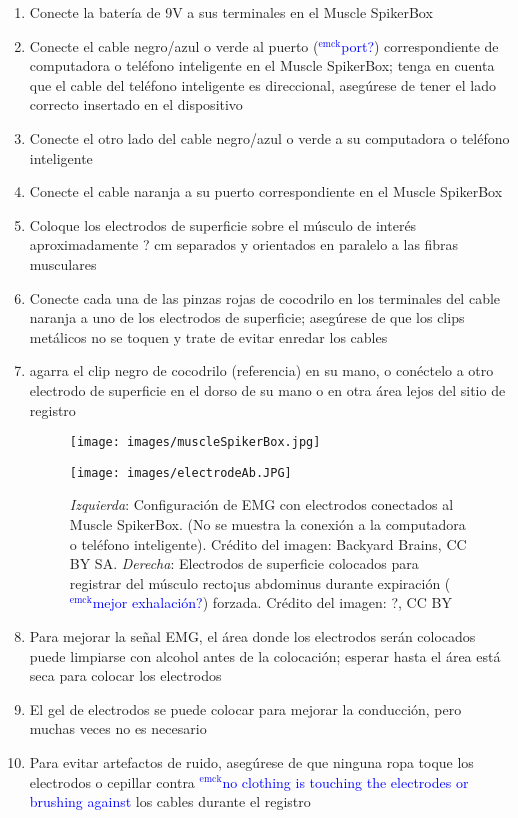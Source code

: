 \documentclass[12pt]{article}
\newcommand{\emck}[1]{\textcolor{blue}{$^{\textrm{emck}}${#1}}}
\begin{document}
\begin{enumerate}
\item Conecte la batería de 9V a sus terminales en el Muscle SpikerBox
\item Conecte el cable negro/azul o verde al puerto (\emck{port?})
  correspondiente de computadora o teléfono inteligente en el Muscle
  SpikerBox; tenga en cuenta que el cable del teléfono inteligente es
  direccional, asegúrese de tener el lado correcto insertado en el
  dispositivo
\item Conecte el otro lado del cable negro/azul o verde a su
  computadora o teléfono inteligente
\item Conecte el cable naranja a su puerto correspondiente en el Muscle
SpikerBox
\item Coloque los electrodos de superficie sobre el músculo de interés
  aproximadamente ? cm separados y orientados en paralelo a las
  fibras musculares
\item Conecte cada una de las pinzas rojas de cocodrilo en los
  terminales del cable naranja a uno de los electrodos de superficie;
  asegúrese de que los clips metálicos no se toquen y trate de evitar
  enredar los cables
\item agarra el clip negro de cocodrilo (referencia) en su mano, o
  conéctelo a otro electrodo de superficie en el dorso de su mano o en
  otra área lejos del sitio de registro

\vspace{0.2cm}

\begin{figure}[h!]
\begin{center}
\begin{minipage}{.55\textwidth}
\centering
\texttt{[image: images/muscleSpikerBox.jpg]}
\end{minipage}%
\begin{minipage}{.4\textwidth}
\centering
\texttt{[image: images/electrodeAb.JPG]}
\end{minipage}
\end{center}
\caption{\textit{Izquierda}: Configuración de EMG con electrodos
  conectados al Muscle SpikerBox. (No se muestra la conexión a la
  computadora o teléfono inteligente). Crédito del imagen: Backyard
  Brains, CC BY SA. \textit{Derecha}: Electrodos de superficie
  colocados para registrar del músculo recto¡us abdominus durante
  expiración (\emck{mejor exhalación?}) forzada. Crédito del
  imagen: ?, CC BY}
\label{fig:spirAssembly}
\end{figure}

\item Para mejorar la señal EMG, el área donde los electrodos serán
  colocados puede limpiarse con alcohol antes de la colocación;
  esperar hasta el área está seca para colocar los electrodos
\item El gel de electrodos se puede colocar para mejorar la
  conducción, pero muchas veces no es necesario
\item Para evitar artefactos de ruido, asegúrese de que ninguna ropa
  toque los electrodos o cepillar contra \emck{no clothing is touching
    the electrodes or brushing against} los cables durante el registro
\end{enumerate}
 
\end{document}
